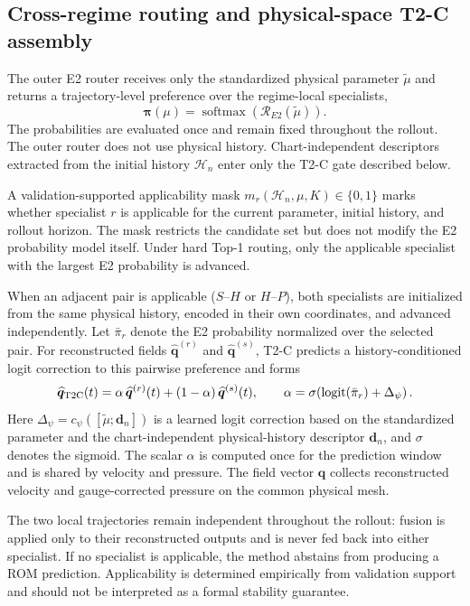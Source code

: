 \documentclass{article}
\begin{document}
\subsection{Cross-regime routing and physical-space T2-C assembly}

The outer E2 router receives only the standardized physical parameter $\widetilde\mu$ and returns a trajectory-level preference over the
regime-local specialists,
\[
\bm\pi(\mu)
=
\operatorname{softmax}\!\left(
\mathcal R_{E2}(\widetilde\mu)
\right).
\]
The probabilities are evaluated once and remain fixed throughout the rollout. The outer router does not use physical history. Chart-independent descriptors extracted from the initial history $\mathcal H_n$ enter only the T2-C gate described below.

A validation-supported applicability mask $m_r(\mathcal H_n,\mu,K)\in\{0,1\}$ marks whether specialist $r$ is applicable for the current parameter, initial history, and rollout horizon. The mask restricts the candidate set but does not modify the E2 probability
model itself. Under hard Top-1 routing, only the applicable specialist with the largest E2 probability is advanced.

When an adjacent pair is applicable ($S$--$H$ or $H$--$P$), both specialists are initialized from the same physical history, encoded in
their own coordinates, and advanced independently. Let $\bar\pi_r$ denote the E2 probability normalized over the selected pair. For reconstructed fields $\widehat{\bm q}^{(r)}$ and $\widehat{\bm q}^{(s)}$, T2-C predicts a history-conditioned logit correction to this pairwise preference and forms
\begin{equation}
  \widehat{\bm q}_{\rm T2C}(t)
  =\alpha\,\widehat{\bm q}^{(r)}(t)
  +(1-\alpha)\,\widehat{\bm q}^{(s)}(t),
  \qquad
  \alpha=
  \sigma\!\left(
  \operatorname{logit}(\bar\pi_r)+\Delta_\psi
  \right).
  \label{eq:main_t2c}
\end{equation}
Here $\Delta_\psi=c_\psi([\widetilde\mu;\bm d_n])$ is a learned logit correction based on the standardized parameter and the chart-independent physical-history descriptor $\bm d_n$, and $\sigma$ denotes the sigmoid. The scalar $\alpha$ is computed once for the prediction window and is shared by velocity and pressure. The field vector $\bm q$ collects reconstructed velocity and gauge-corrected pressure on the common physical mesh.

The two local trajectories remain independent throughout the rollout: fusion is applied only to their reconstructed outputs and is never fed back into either specialist. If no specialist is applicable, the method abstains from producing a ROM prediction. Applicability is determined empirically from validation support and should not be interpreted as a formal stability guarantee.
\end{document}
